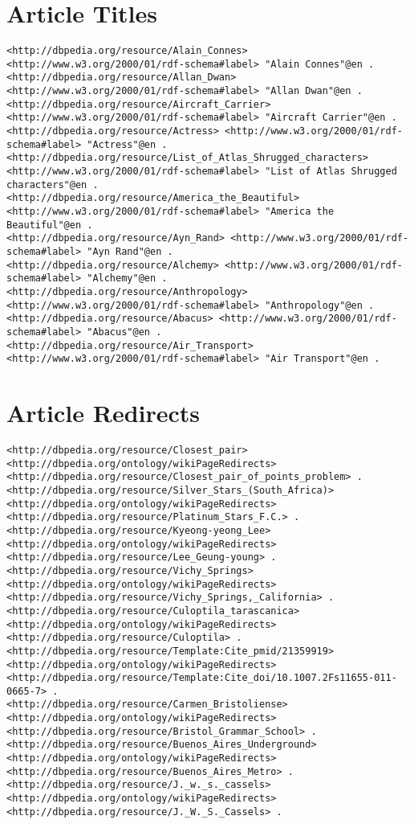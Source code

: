 \section{Article Titles}
\begin{lstlisting}[breaklines, basicstyle=\small]
<http://dbpedia.org/resource/Alain_Connes> <http://www.w3.org/2000/01/rdf-schema#label> "Alain Connes"@en .
<http://dbpedia.org/resource/Allan_Dwan> <http://www.w3.org/2000/01/rdf-schema#label> "Allan Dwan"@en .
<http://dbpedia.org/resource/Aircraft_Carrier> <http://www.w3.org/2000/01/rdf-schema#label> "Aircraft Carrier"@en .
<http://dbpedia.org/resource/Actress> <http://www.w3.org/2000/01/rdf-schema#label> "Actress"@en .
<http://dbpedia.org/resource/List_of_Atlas_Shrugged_characters> <http://www.w3.org/2000/01/rdf-schema#label> "List of Atlas Shrugged characters"@en .
<http://dbpedia.org/resource/America_the_Beautiful> <http://www.w3.org/2000/01/rdf-schema#label> "America the Beautiful"@en .
<http://dbpedia.org/resource/Ayn_Rand> <http://www.w3.org/2000/01/rdf-schema#label> "Ayn Rand"@en .
<http://dbpedia.org/resource/Alchemy> <http://www.w3.org/2000/01/rdf-schema#label> "Alchemy"@en .
<http://dbpedia.org/resource/Anthropology> <http://www.w3.org/2000/01/rdf-schema#label> "Anthropology"@en .
<http://dbpedia.org/resource/Abacus> <http://www.w3.org/2000/01/rdf-schema#label> "Abacus"@en .
<http://dbpedia.org/resource/Air_Transport> <http://www.w3.org/2000/01/rdf-schema#label> "Air Transport"@en .
\end{lstlisting}

\section{Article Redirects}
\begin{lstlisting}[breaklines, basicstyle=\small]
<http://dbpedia.org/resource/Closest_pair> <http://dbpedia.org/ontology/wikiPageRedirects> <http://dbpedia.org/resource/Closest_pair_of_points_problem> .
<http://dbpedia.org/resource/Silver_Stars_(South_Africa)> <http://dbpedia.org/ontology/wikiPageRedirects> <http://dbpedia.org/resource/Platinum_Stars_F.C.> .
<http://dbpedia.org/resource/Kyeong-yeong_Lee> <http://dbpedia.org/ontology/wikiPageRedirects> <http://dbpedia.org/resource/Lee_Geung-young> .
<http://dbpedia.org/resource/Vichy_Springs> <http://dbpedia.org/ontology/wikiPageRedirects> <http://dbpedia.org/resource/Vichy_Springs,_California> .
<http://dbpedia.org/resource/Culoptila_tarascanica> <http://dbpedia.org/ontology/wikiPageRedirects> <http://dbpedia.org/resource/Culoptila> .
<http://dbpedia.org/resource/Template:Cite_pmid/21359919> <http://dbpedia.org/ontology/wikiPageRedirects> <http://dbpedia.org/resource/Template:Cite_doi/10.1007.2Fs11655-011-0665-7> .
<http://dbpedia.org/resource/Carmen_Bristoliense> <http://dbpedia.org/ontology/wikiPageRedirects> <http://dbpedia.org/resource/Bristol_Grammar_School> .
<http://dbpedia.org/resource/Buenos_Aires_Underground> <http://dbpedia.org/ontology/wikiPageRedirects> <http://dbpedia.org/resource/Buenos_Aires_Metro> .
<http://dbpedia.org/resource/J._w._s._cassels> <http://dbpedia.org/ontology/wikiPageRedirects> <http://dbpedia.org/resource/J._W._S._Cassels> .
\end{lstlisting}

